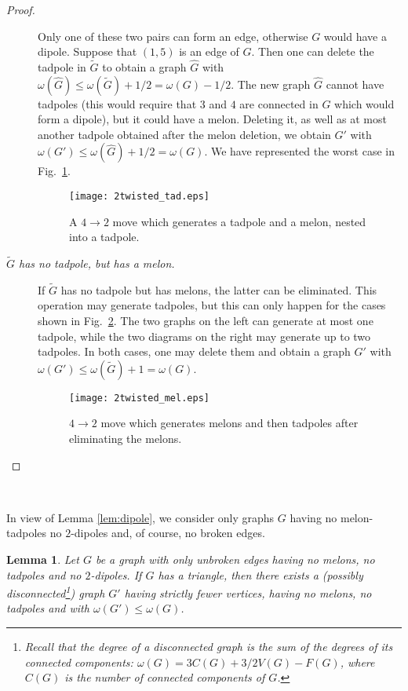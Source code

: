 \documentclass[10pt]{article}
\theoremstyle{plain}
\newtheorem{lemma}{Lemma}
\theoremstyle{definition}
\begin{document}
\begin{proof}
\begin{description}
Only one of these two pairs can form an edge, otherwise $G$ would have a dipole. Suppose that $(1,5)$ is an edge of $G$. 
Then one can delete the tadpole in $\tilde G$ to obtain a graph $\hat G$ with $\omega(\hat G) \leq \omega(\tilde G) + 1/2 = \omega(G) - 1/2$. The new graph $\hat G$ cannot have tadpoles 
(this would require that $3$ and $4$ are connected in $G$ which would form a dipole), but it could have a melon. 
Deleting it, as well as at most another tadpole obtained after the melon deletion, we obtain $G'$ with $\omega(G') \leq \omega(\hat G) + 1/2 = \omega(G)$.
We have represented the worst case in Fig.~\ref{fig:2twisted_tad}.

\begin{figure}[htb]
 \begin{center}
 \texttt{[image: 2twisted\_tad.eps]}  
 \caption{A $4\to2$ move which generates a tadpole and a melon, nested into a tadpole.} \label{fig:2twisted_tad}
 \end{center}
 \end{figure}
\item[\it $\tilde G$ has no tadpole, but has a melon.]
If $\tilde G$ has no tadpole but has melons, the latter can be eliminated. This operation may generate tadpoles, but this can only happen for the
cases shown in Fig.~\ref{fig:2twisted_mel}. The two graphs on the left can generate at most one tadpole, while the two diagrams on the right may generate up to two tadpoles. In both cases, one
may delete them and obtain a graph $G'$ with $\omega(G') \leq \omega(\tilde G) + 1 = \omega(G)$. 
\begin{figure}[htb]
 \begin{center}
 \texttt{[image: 2twisted\_mel.eps]}  
 \caption{$4\to2$ move which generates melons and then tadpoles after eliminating the melons.} \label{fig:2twisted_mel}
 \end{center}
 \end{figure}  
\end{description}
\end{proof}

\

In view of Lemma \ref{lem:dipole}, we consider only graphs $G$ having no melon-tadpoles no $2$-dipoles and, of course, no broken edges.
\begin{lemma}\label{lem:tripole}
Let $G$ be a graph with only unbroken edges having no melons, no tadpoles and no $2$-dipoles. If $G$ has a triangle, then there exists a (possibly 
disconnected\footnote{Recall that the degree of a disconnected graph is the sum of the degrees of its connected components: $\omega(G) = 3 C(G) + 3/2 V(G) - F(G)$, where 
$C(G)$ is the number of connected components of $G$.}) graph $G'$ having strictly fewer vertices, having 
no melons, no tadpoles and with $\omega(G') \le \omega(G)$.
\end{lemma}
\end{document}
